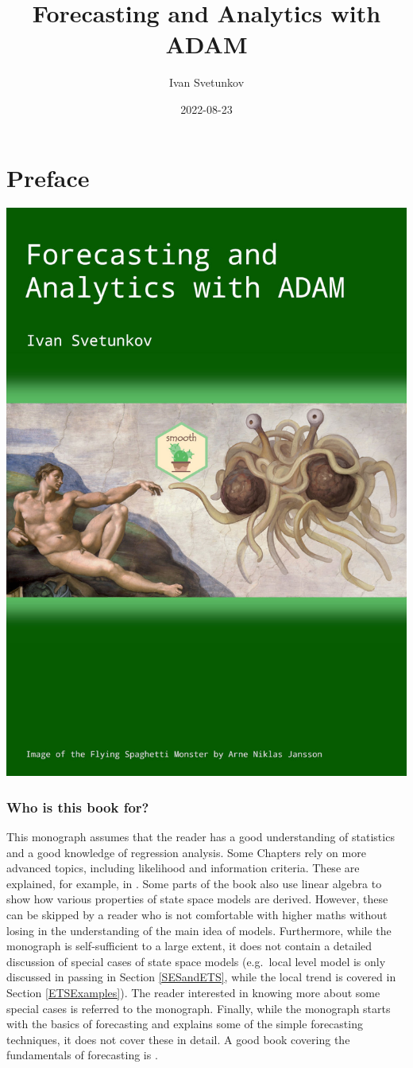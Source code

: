 \documentclass[]{book}
\title{Forecasting and Analytics with ADAM}
\author{Ivan Svetunkov}
\date{2022-08-23}
\theoremstyle{definition}
\theoremstyle{definition}
\theoremstyle{definition}
\theoremstyle{definition}
\theoremstyle{remark}
\begin{document}
\maketitle

{
\setcounter{tocdepth}{1}
\tableofcontents
}
\hypertarget{preface}{%
\chapter*{Preface}\label{preface}}

\begin{center}\includegraphics[width=0.6\linewidth]{images/Adam-Title-web} \end{center}

\hypertarget{who-is-this-book-for}{%
\subsection*{Who is this book for?}\label{who-is-this-book-for}}

This monograph assumes that the reader has a good understanding of statistics and a good knowledge of regression analysis. Some Chapters rely on more advanced topics, including likelihood and information criteria. These are explained, for example, in \citet{SvetunkovSBA}. Some parts of the book also use linear algebra to show how various properties of state space models are derived. However, these can be skipped by a reader who is not comfortable with higher maths without losing in the understanding of the main idea of models. Furthermore, while the monograph is self-sufficient to a large extent, it does not contain a detailed discussion of special cases of state space models (e.g.~local level model is only discussed in passing in Section \ref{SESandETS}, while the local trend is covered in Section \ref{ETSExamples}). The reader interested in knowing more about some special cases is referred to the \citet{Hyndman2008b} monograph. Finally, while the monograph starts with the basics of forecasting and explains some of the simple forecasting techniques, it does not cover these in detail. A good book covering the fundamentals of forecasting is \citet{Ord2017}.
\end{document}
